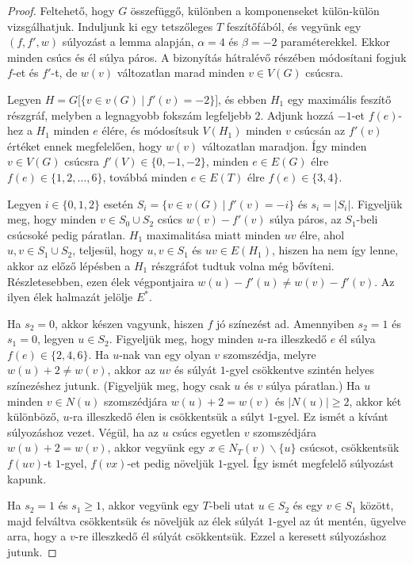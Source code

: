 \documentclass[12pt, a4paper]{report}
\theoremstyle{remark}
\theoremstyle{definition}
\begin{document}
\begin{proof}
Feltehető, hogy $G$ összefüggő, különben a komponenseket külön-külön vizsgálhatjuk. Induljunk ki egy tetszőleges $T$ feszítőfából, és vegyünk egy $(f, f', w)$ súlyozást a lemma alapján, $\alpha = 4$ és $\beta = -2$ paraméterekkel. Ekkor minden csúcs és él súlya páros. A bizonyítás hátralévő részében módosítani fogjuk $f$-et és $f'$-t, de $w(v)$ változatlan marad minden $v \in V(G)$ csúcsra.

Legyen $H = G\lbrack \lbrace v \in v(G)\ |\ f'(v) = -2 \rbrace \rbrack$, és ebben $H_1$ egy maximális feszítő részgráf, melyben a legnagyobb fokszám legfeljebb $2$. Adjunk hozzá $-1$-et $f(e)$-hez a $H_1$ minden $e$ élére, és módosítsuk $V(H_1)$ minden $v$ csúcsán az $f'(v)$ értéket ennek megfelelően, hogy $w(v)$ változatlan maradjon. Így minden $v \in V(G)$ csúcsra $f'(V) \in \lbrace 0, -1, -2 \rbrace$, minden $e \in E(G)$ élre $f(e) \in \lbrace 1, 2, \ldots, 6 \rbrace$, továbbá minden $e \in E(T)$ élre $f(e) \in \lbrace 3, 4 \rbrace$.

Legyen $i \in \lbrace 0, 1, 2 \rbrace$ esetén $S_i = \lbrace v \in v(G)\ |\ f'(v) = -i \rbrace$ és $s_i = |S_i|$. Figyeljük meg, hogy minden $v \in S_0 \cup S_2$ csúcs $w(v) - f'(v)$ súlya páros, az $S_1$-beli csúcsoké pedig páratlan. $H_1$ maximalitása miatt minden $uv$ élre, ahol $u, v \in S_1 \cup S_2$, teljesül, hogy $u, v \in S_1$ és $uv \in E(H_1)$, hiszen ha nem így lenne, akkor az előző lépésben a $H_1$ részgráfot tudtuk volna még bővíteni. Részletesebben, ezen élek végpontjaira $w(u) - f'(u) \neq w(v) - f'(v)$. Az ilyen élek halmazát jelölje $E^*$.

Ha $s_2 = 0$, akkor készen vagyunk, hiszen $f$ jó színezést ad. Amennyiben $s_2 = 1$ és $s_1 = 0$, legyen $u \in S_2$. Figyeljük meg, hogy minden $u$-ra illeszkedő $e$ él súlya $f(e) \in \lbrace 2, 4, 6 \rbrace$. Ha $u$-nak van egy olyan $v$ szomszédja, melyre $w(u) + 2 \neq w(v)$, akkor az $uv$ és súlyát $1$-gyel csökkentve szintén helyes színezéshez jutunk. (Figyeljük meg, hogy csak $u$ és $v$ súlya páratlan.) Ha $u$ minden $v \in N(u)$ szomszédjára $w(u) + 2 = w(v)$ és $|N(u)| \geq 2$, akkor két különböző, $u$-ra illeszkedő élen is csökkentsük a súlyt $1$-gyel. Ez ismét a kívánt súlyozáshoz vezet. Végül, ha az $u$ csúcs egyetlen $v$ szomszédjára $w(u) + 2 = w(v)$, akkor vegyünk egy $x \in N_T(v) \smallsetminus \lbrace u \rbrace$ csúcsot, csökkentsük $f(uv)$-t $1$-gyel, $f(vx)$-et pedig növeljük $1$-gyel. Így ismét megfelelő súlyozást kapunk.

Ha $s_2 = 1$ és $s_1 \geq 1$, akkor vegyünk egy $T$-beli utat $u \in S_2$ és egy $v \in S_1$ között, majd felváltva csökkentsük és növeljük az élek súlyát $1$-gyel az út mentén, ügyelve arra, hogy a $v$-re illeszkedő él súlyát csökkentsük. Ezzel a keresett súlyozáshoz jutunk.


\end{proof}
\end{document}
